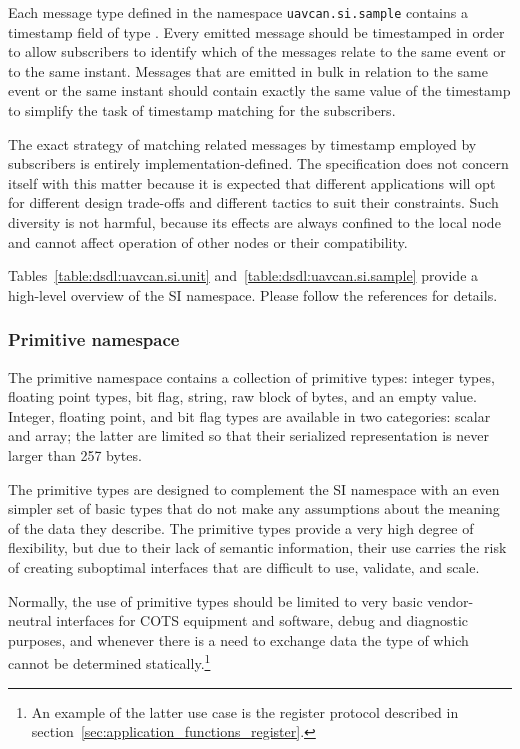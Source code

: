Each message type defined in the namespace \verb|uavcan.si.sample| contains a timestamp field of type
.
Every emitted message should be timestamped in order to allow subscribers to identify which of the messages
relate to the same event or to the same instant.
Messages that are emitted in bulk in relation to the same event or the same instant should contain
exactly the same value of the timestamp to simplify the task of timestamp matching for the subscribers.

The exact strategy of matching related messages by timestamp employed by subscribers is entirely
implementation-defined.
The specification does not concern itself with this matter because it is expected that different applications
will opt for different design trade-offs and different tactics to suit their constraints.
Such diversity is not harmful, because its effects are always confined to the local node and cannot affect
operation of other nodes or their compatibility.

Tables~\ref{table:dsdl:uavcan.si.unit} and~\ref{table:dsdl:uavcan.si.sample}
provide a high-level overview of the SI namespace.
Please follow the references for details.



\subsubsection{Primitive namespace}

The primitive namespace contains a collection of primitive types:
integer types, floating point types, bit flag, string, raw block of bytes, and an empty value.
Integer, floating point, and bit flag types are available in two categories: scalar and array;
the latter are limited so that their serialized representation is never larger than 257 bytes.

The primitive types are designed to complement the SI namespace with an even simpler set of basic types
that do not make any assumptions about the meaning of the data they describe.
The primitive types provide a very high degree of flexibility, but due to their lack of semantic information,
their use carries the risk of creating suboptimal interfaces that are difficult to use, validate, and scale.

Normally, the use of primitive types should be limited to very basic vendor-neutral interfaces for COTS
equipment and software, debug and diagnostic purposes, and whenever there is a need to exchange data the
type of which cannot be determined statically.\footnote{%
      An example of the latter use case is the register protocol described
      in section~\ref{sec:application_functions_register}.
}

